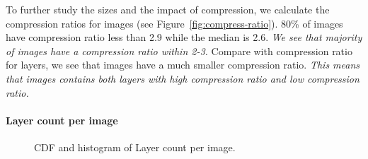 
To further study the sizes and the impact of compression, we calculate the
compression ratios for images (see Figure~\ref{fig:compress-ratio}).
80\% of images have compression ratio less than 2.9 while the median is 2.6. 
\textit{We see that majority of images have a compression ratio within 2-3.}
Compare with compression ratio for layers, we see that images have a much smaller
compression ratio. 
\textit{This means that images contains both layers with high compression ratio and low compression ratio.}

%
%
%
%
%
%

\paragraph{Layer count per image}

\begin{figure}[!t]
	\centering
	\caption{CDF and histogram of Layer count per image.}
	\label{fig:image-size}
\end{figure}

